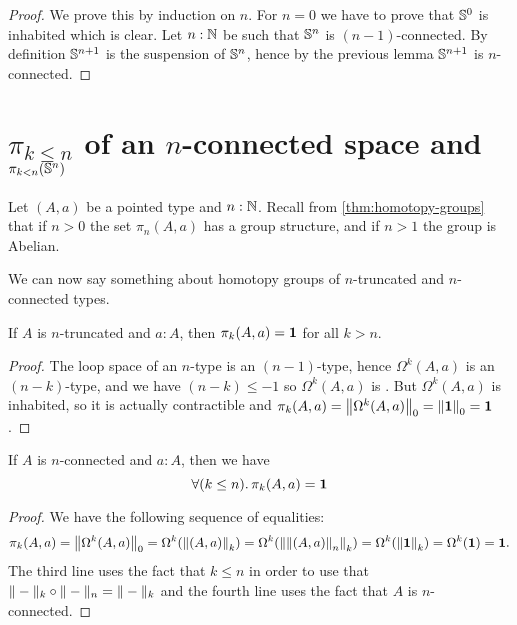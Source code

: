 \begin{proof}
  We prove this by induction on $n$.
  For $n=0$ we have to prove that $\Sn^0$ is inhabited which is clear.
  Let $n:\N$ be such that $\Sn^n$ is $(n-1)$-connected. By definition $\Sn^{n+1}$
  is the suspension of $\Sn^n$, hence by the previous lemma $\Sn^{n+1}$ is
  $n$-connected.
\end{proof}

\section{\texorpdfstring{$\pi_{k \le n}$}{π\_(k≤n)} of an \texorpdfstring{$n$}{n}-connected space and \texorpdfstring{$\pi_{k < n}(\Sn ^n)$}{π\_(k<n)(Sⁿ)}}
\label{sec:pik-le-n}

Let $(A,a)$ be a pointed type and $n:\N$.  Recall from
\autoref{thm:homotopy-groups} that if $n>0$ the set $\pi_n(A,a)$ has a group
structure, and if $n>1$ the group is Abelian.

We can now say something about homotopy groups of $n$-truncated and
$n$-connected types.

\begin{lem}
  If $A$ is $n$-truncated and $a:A$, then $\pi_k(A,a)=\unit$ for all $k>n$.
\end{lem}

\begin{proof}
  The loop space of an $n$-type  is an
  $(n-1)$-type, hence $\Omega^k(A,a)$ is an $(n-k)$-type, and we have
  $(n-k)\le-1$ so $\Omega^k(A,a)$ is \anhprop. But $\Omega^k(A,a)$ is inhabited,
  so it is actually contractible and
  $\pi_k(A,a)=\trunc0{\Omega^k(A,a)}=\trunc0{\unit}=\unit$.
\end{proof}

\begin{lem} \label{lem:pik-nconnected}
  If $A$ is $n$-connected and $a:A$, then we have
  \[\fall{k\le{}n} \pi_k(A,a)=\unit\]
\end{lem}

\begin{proof}
  We have the following sequence of equalities:
  \begin{multline*}
    \pi_k(A,a) = \trunc0{\Omega^k(A,a)}
    = \Omega^k(\trunc k{(A,a)})
    = \Omega^k(\trunc k{\trunc n{(A,a)}})
    = \Omega^k(\trunc k{\unit})
    = \Omega^k(\unit)
    = \unit.
  \end{multline*}
  The third line uses the fact that $k\le{}n$ in order to use that
  $\truncf k\circ\truncf n=\truncf k$ and the fourth line uses the fact that $A$ is
  $n$-connected.
\end{proof}

